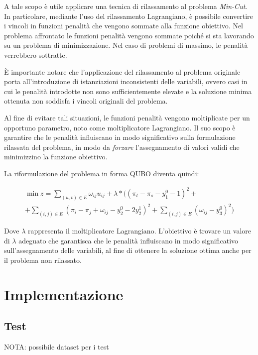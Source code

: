 \documentclass{article}
\begin{document}
A tale scopo è utile applicare una tecnica di rilassamento al problema \emph{Min-Cut}. In particolare, mediante l'uso del rilassamento Lagrangiano, è possibile convertire i vincoli in funzioni penalità che vengono sommate alla funzione obiettivo. Nel problema affrontato le funzioni penalità vengono sommate poiché si sta lavorando su un problema di minimizzazione. Nel caso di problemi di massimo, le penalità verrebbero sottratte.

È importante notare che l'applicazione del rilassamento al problema originale porta all'introduzione di istanziazioni inconsistenti delle variabili, ovvero casi in cui le penalità introdotte non sono sufficientemente elevate e la soluzione minima ottenuta non soddisfa i vincoli originali del problema.

Al fine di evitare tali situazioni, le funzioni penalità vengono moltiplicate per un opportuno parametro, noto come moltiplicatore Lagrangiano. Il suo scopo è garantire che le penalità influiscano in modo significativo sulla formulazione rilassata del problema, in modo da \emph{forzare} l'assegnamento di valori validi che minimizzino la funzione obiettivo.

La riformulazione del problema in forma QUBO diventa quindi:

\begin{center}
    \begin{multline*}
        \min z = \sum_{(u, v) \in E} \omega_{ij}u_{ij} + \lambda*((\pi_t - \pi_s - y_1^0 - 1)^2 +
        \\+ \sum_{(i, j) \in E}(\pi_i - \pi_j + \omega_{ij} - y_2^0 - 2y_2^1)^2 + \sum_{(i, j) \in E}(\omega_{ij} - y_3^0)^2)
    \end{multline*}    
\end{center}

Dove $\lambda$ rappresenta il moltiplicatore Lagrangiano. L'obiettivo è trovare un valore di $\lambda$ adeguato che garantisca che le penalità influiscano in modo significativo sull'assegnamento delle variabili, al fine di ottenere la soluzione ottima anche per il problema non rilassato.
\pagebreak

\section{Implementazione}

\subsection{Test}
NOTA: possibile dataset per i test \cite{Jensen2022}




\end{document}
